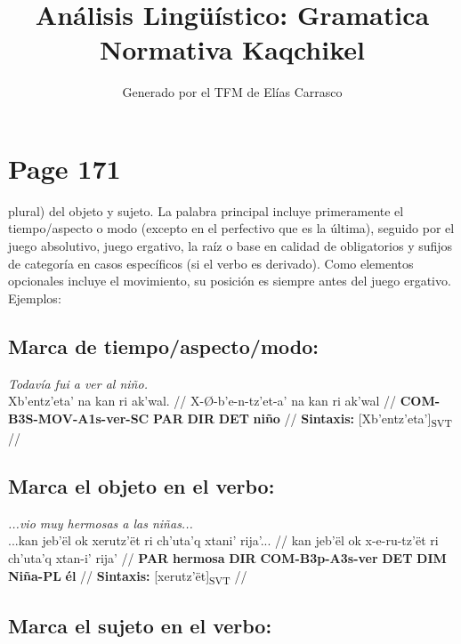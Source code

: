 \documentclass{article}%
\title{Análisis Lingüístico: Gramatica Normativa Kaqchikel}%
\author{Generado por el TFM de Elías Carrasco}%
\begin{document}
%
\normalsize%
\maketitle%
\section{Page 171}%
\label{sec:Page171}%
plural) del objeto y sujeto. La palabra principal incluye primeramente el tiempo/aspecto %
o modo (excepto en el perfectivo que es la última), seguido por el juego absolutivo, %
juego ergativo, la raíz o base en calidad de obligatorios y sufijos de categoría en casos %
específicos (si el verbo es derivado). Como elementos opcionales incluye el movimiento, %
su posición es siempre antes del juego ergativo. Ejemplos: %
\subsection{Marca de tiempo/aspecto/modo:}%
\label{subsec:Marcadetiempo/aspecto/modo}%

%
\par\medskip%
\ex
\textit{Todavía fui a ver al niño.} \\
\begingl
\gla Xb'entz'eta' na kan ri ak'wal. //
\glb X-Ø-b'e-n-tz'et-a' na kan ri ak'wal //
\glc \textbf{COM-}\textbf{B3S-}\textbf{MOV-}\textbf{A1s-}\textbf{ver-}\textbf{SC} \textbf{PAR} \textbf{DIR} \textbf{DET} \textbf{niño} //
\glft \textbf{Sintaxis:} [Xb'entz'eta']\textsubscript{SVT} //
\endgl
\xe
%
\medskip%
\subsection{Marca el objeto en el verbo:}%
\label{subsec:Marcaelobjetoenelverbo}%

%
\par\medskip%
\ex
\textit{...vio muy hermosas a las niñas...} \\
\begingl
\gla ...kan jeb'ël ok xerutz'ët ri ch'uta'q xtani' rija'... //
\glb kan jeb'ël ok x-e-ru-tz'ët ri ch'uta'q xtan-i' rija' //
\glc \textbf{PAR} \textbf{hermosa} \textbf{DIR} \textbf{COM-}\textbf{B3p-}\textbf{A3s-}\textbf{ver} \textbf{DET} \textbf{DIM} \textbf{Niña-}\textbf{PL} \textbf{él} //
\glft \textbf{Sintaxis:} [xerutz'ët]\textsubscript{SVT} //
\endgl
\xe
%
\medskip%
\subsection{Marca el sujeto en el verbo:}%
\label{subsec:Marcaelsujetoenelverbo}%
\end{document}

